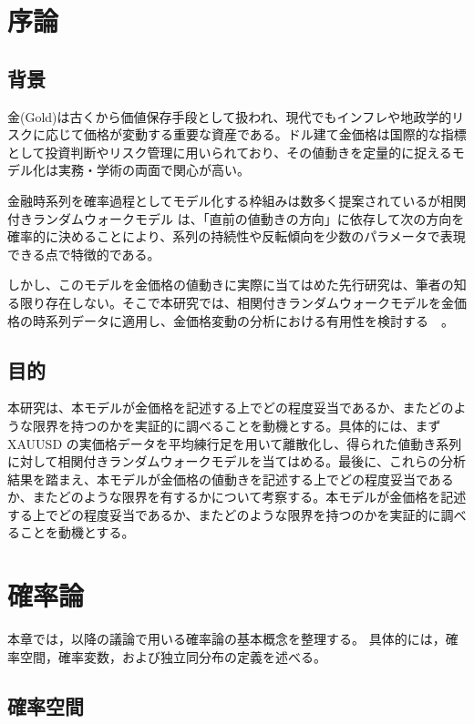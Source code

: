 \documentclass[a4j,dvipdfmx]{jsarticle}
\theoremstyle{plainnote}
\begin{document}
\section{序論}

\subsection{背景}
金(Gold)は古くから価値保存手段として扱われ、現代でもインフレや地政学的リスクに応じて価格が変動する重要な資産である。ドル建て金価格は国際的な指標として投資判断やリスク管理に用いられており、その値動きを定量的に捉えるモデル化は実務・学術の両面で関心が高い。

金融時系列を確率過程としてモデル化する枠組みは数多く提案されているが相関付きランダムウォークモデル は、「直前の値動きの方向」に依存して次の方向を確率的に決めることにより、系列の持続性や反転傾向を少数のパラメータで表現できる点で特徴的である。

しかし、このモデルを金価格の値動きに実際に当てはめた先行研究は、筆者の知る限り存在しない。そこで本研究では、相関付きランダムウォークモデルを金価格の時系列データに適用し、金価格変動の分析における有用性を検討する　。

\subsection{目的}
本研究は、本モデルが金価格を記述する上でどの程度妥当であるか、またどのような限界を持つのかを実証的に調べることを動機とする。具体的には、まず XAUUSD の実価格データを平均練行足を用いて離散化し、得られた値動き系列に対して相関付きランダムウォークモデルを当てはめる。最後に、これらの分析結果を踏まえ、本モデルが金価格の値動きを記述する上でどの程度妥当であるか、またどのような限界を有するかについて考察する。本モデルが金価格を記述する上でどの程度妥当であるか、またどのような限界を持つのかを実証的に調べることを動機とする。


\section{確率論}

本章では，以降の議論で用いる確率論の基本概念を整理する。
具体的には，確率空間，確率変数，および独立同分布の定義を述べる。

\subsection{確率空間}
\end{document}
